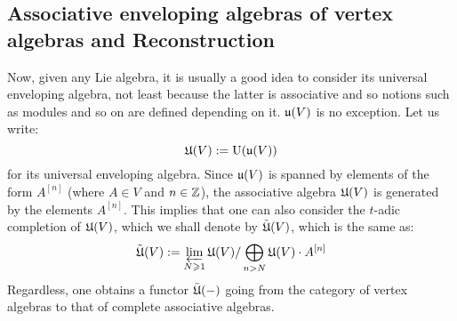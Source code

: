     \subsection{Associative enveloping algebras of vertex algebras and Reconstruction}
        Now, given any Lie algebra, it is usually a good idea to consider its universal enveloping algebra, not least because the latter is associative and so notions such as modules and so on are defined depending on it. $\mathfrak{u}(V)$ is no exception. Let us write:
            $$\mathfrak{U}(V) := \mathrm{U}(\mathfrak{u}(V))$$
        for its universal enveloping algebra. Since $\mathfrak{u}(V)$ is spanned by elements of the form $A^{[n]}$ (where $A \in V$ and $n \in \mathbb{Z}$), the associative algebra $\mathfrak{U}(V)$ is generated by the elements $A^{[n]}$. This implies that one can also consider the $t$-adic completion of $\mathfrak{U}(V)$, which we shall denote by $\tilde{\mathfrak{U}}(V)$, which is the same as:
            $$\tilde{\mathfrak{U}}(V) := \varprojlim_{N \geqslant 1} \mathfrak{U}(V)/\bigoplus_{n > N} \mathfrak{U}(V) \cdot A^{[n]}$$
        Regardless, one obtains a functor $\tilde{\mathfrak{U}}(-)$ going from the category of vertex algebras to that of complete associative algebras.